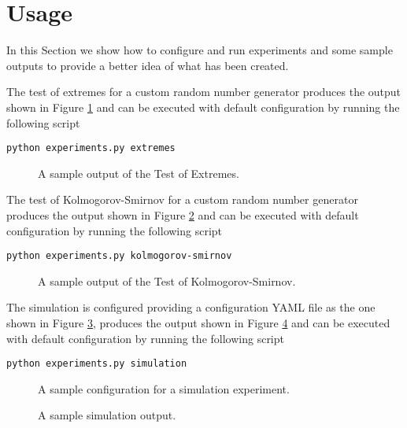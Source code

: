 \section{Usage}
\label{sec:usage}


In this Section we show how to configure and run experiments and some sample outputs to provide a better idea of what has been created.

The test of extremes for a custom random number generator produces the output shown in Figure \ref{fig:usage-randomness-extremes} and can be executed with default configuration by running the following script

\begin{lstlisting}
python experiments.py extremes
\end{lstlisting}

\begin{figure}
	\label{fig:usage-randomness-extremes}
	\centering
	
	\caption{A sample output of the Test of Extremes.}
\end{figure}

The test of Kolmogorov-Smirnov for a custom random number generator produces the output shown in Figure \ref{fig:usage-randomness-kolmogorov-smirnov} and can be executed with default configuration by running the following script

\begin{lstlisting}
python experiments.py kolmogorov-smirnov
\end{lstlisting}

\begin{figure}
	\label{fig:usage-randomness-kolmogorov-smirnov}
	\centering
	
	\caption{A sample output of the Test of Kolmogorov-Smirnov.}
\end{figure}

The simulation is configured providing a configuration YAML file as the one shown in Figure \ref{fig:usage-simulation-configuration}, produces the output shown in Figure \ref{fig:usage-simulation-output} and can be executed with default configuration by running the following script

\begin{lstlisting}
python experiments.py simulation
\end{lstlisting}

\begin{figure}
	\label{fig:usage-simulation-configuration}
	\centering
	
	\caption{A sample configuration for a simulation experiment.}
\end{figure}

\begin{figure}
	\label{fig:usage-simulation-output}
	\centering
	
	\caption{A sample simulation output.}
\end{figure}


